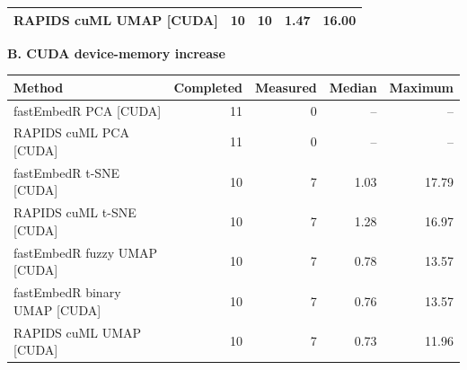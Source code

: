 \begin{table}[!htbp]
\begin{tabular}{p{}rrrr}
RAPIDS cuML UMAP [CUDA] & 10 & 10 & 1.47 & 16.00 \\
\bottomrule
\end{tabular}
\par\medskip
\textbf{B. CUDA device-memory increase}\par\smallskip
\begin{tabular}{p{}rrrr}
\toprule
Method & Completed & Measured & Median & Maximum \\
\midrule
fastEmbedR PCA [CUDA] & 11 & 0 & -- & -- \\
RAPIDS cuML PCA [CUDA] & 11 & 0 & -- & -- \\
fastEmbedR t-SNE [CUDA] & 10 & 7 & 1.03 & 17.79 \\
RAPIDS cuML t-SNE [CUDA] & 10 & 7 & 1.28 & 16.97 \\
fastEmbedR fuzzy UMAP [CUDA] & 10 & 7 & 0.78 & 13.57 \\
fastEmbedR binary UMAP [CUDA] & 10 & 7 & 0.76 & 13.57 \\
RAPIDS cuML UMAP [CUDA] & 10 & 7 & 0.73 & 11.96 \\
\bottomrule
\end{tabular}
\end{table}

